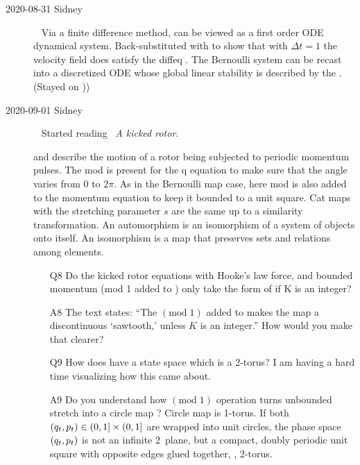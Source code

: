 \begin{description}
\item[2020-08-31 Sidney]~
Via a finite difference method,  can be viewed as a
first order ODE dynamical system. Back-substituted with 
to show that with $\Delta t=1$ the velocity field does satisfy the diffeq
.
The Bernoulli system can be recast into a discretized ODE whose global
linear stability is described by the {\jacobianOrb}.
(Stayed on ))

\item[2020-09-01 Sidney]~
Started reading ~{\em A kicked rotor}.

and  describe the motion of a rotor being subjected to
periodic momentum pulses. The mod is present for the q equation to make
sure that the angle varies from $0$ to $2\pi$. As in the Bernoulli map case,
here
mod is also added to the momentum equation to keep it bounded to a unit
square. Cat maps with the stretching parameter ${s}$ are the same up to a
similarity transformation. An automorphism is an isomorphism of a system
of objects onto itself. An isomorphism is a map that preserves sets and
relations among elements.

\begin{itemize}
	\item[Q8]
Do the kicked rotor equations with Hooke's law force, and bounded momentum (mod 1 added to ) only take the form of  if K is an integer?
	\item[A8]
The text states: ``The
$(\mbox{mod}\;1)$ added to  makes the map a
discontinuous `sawtooth,' unless $K$ is an integer.'' How would you make that clearer?
	\item[Q9]
How does  have a state space which is a 2-torus? I am having a hard time visualizing how this came about.
	\item[A9]
Do you understand how  $(\mbox{mod}\;1)$ operation turns unbounded stretch
 into a circle map ? Circle map is
1-torus. If both
\(
(q_{t},p_{t}) \in  (0,1]\times(0,1]
\)
are wrapped into unit circles, the phase space $(q_{t},p_{t})$
is not an infinite 2\dmn\ plane, but a compact, doubly periodic unit square with
opposite edges glued together, \ie, 2-torus.
\end{itemize}



\end{description}
